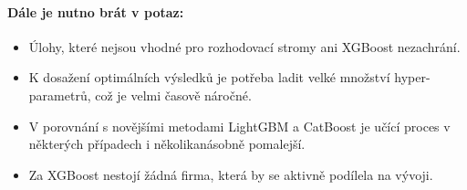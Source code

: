 \documentclass[a4paper]{article}
\begin{document}
\paragraph{Dále je nutno brát v potaz:}
\begin{itemize}
\item Úlohy, které nejsou vhodné pro rozhodovací stromy ani XGBoost nezachrání.
\item K dosažení optimálních výsledků je potřeba ladit velké množství hyper-parametrů, což je velmi časově náročné.
\item V porovnání s novějšími metodami LightGBM \cite{NIPS2017_6907} a CatBoost \cite{DBLP:journals/corr/DorogushGGKPV17} je učící proces v některých případech i několikanásobně pomalejší.
\item Za XGBoost nestojí žádná firma, která by se aktivně podílela na vývoji.
\end{itemize}



\end{document}
